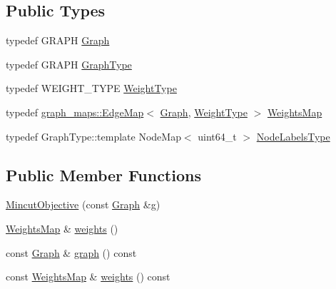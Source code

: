 \subsection*{Public Types}
\begin{DoxyCompactItemize}
\item 
typedef G\+R\+A\+P\+H \hyperlink{classnifty_1_1graph_1_1optimization_1_1mincut_1_1MincutObjective_a14651256f6659a97c452e9469b1df0c7}{Graph}
\item 
typedef G\+R\+A\+P\+H \hyperlink{classnifty_1_1graph_1_1optimization_1_1mincut_1_1MincutObjective_a67e2a1dba7b35b0ead06ce8b74152215}{Graph\+Type}
\item 
typedef W\+E\+I\+G\+H\+T\+\_\+\+T\+Y\+P\+E \hyperlink{classnifty_1_1graph_1_1optimization_1_1mincut_1_1MincutObjective_acbc5ba581d4e1677cee62a26001786a8}{Weight\+Type}
\item 
typedef \hyperlink{structnifty_1_1graph_1_1graph__maps_1_1EdgeMap}{graph\+\_\+maps\+::\+Edge\+Map}$<$ \hyperlink{classnifty_1_1graph_1_1optimization_1_1mincut_1_1MincutObjective_a14651256f6659a97c452e9469b1df0c7}{Graph}, \hyperlink{classnifty_1_1graph_1_1optimization_1_1mincut_1_1MincutObjective_acbc5ba581d4e1677cee62a26001786a8}{Weight\+Type} $>$ \hyperlink{classnifty_1_1graph_1_1optimization_1_1mincut_1_1MincutObjective_ad4674bd22bb638b7d83a3cf31059e4ed}{Weights\+Map}
\item 
typedef Graph\+Type\+::template Node\+Map$<$ uint64\+\_\+t $>$ \hyperlink{classnifty_1_1graph_1_1optimization_1_1mincut_1_1MincutObjective_aae8f1cd3353a96dfe22a0ba35f3f4ac3}{Node\+Labels\+Type}
\end{DoxyCompactItemize}
\subsection*{Public Member Functions}
\begin{DoxyCompactItemize}
\item 
\hyperlink{classnifty_1_1graph_1_1optimization_1_1mincut_1_1MincutObjective_ad3e8f453068825c86f09706e159e44fb}{Mincut\+Objective} (const \hyperlink{classnifty_1_1graph_1_1optimization_1_1mincut_1_1MincutObjective_a14651256f6659a97c452e9469b1df0c7}{Graph} \&g)
\item 
\hyperlink{classnifty_1_1graph_1_1optimization_1_1mincut_1_1MincutObjective_ad4674bd22bb638b7d83a3cf31059e4ed}{Weights\+Map} \& \hyperlink{classnifty_1_1graph_1_1optimization_1_1mincut_1_1MincutObjective_a0962678c9517b7b3299c05f5b772d4c0}{weights} ()
\item 
const \hyperlink{classnifty_1_1graph_1_1optimization_1_1mincut_1_1MincutObjective_a14651256f6659a97c452e9469b1df0c7}{Graph} \& \hyperlink{classnifty_1_1graph_1_1optimization_1_1mincut_1_1MincutObjective_a4a16c0bf0365692e5b213ee29938a1b6}{graph} () const 
\item 
const \hyperlink{classnifty_1_1graph_1_1optimization_1_1mincut_1_1MincutObjective_ad4674bd22bb638b7d83a3cf31059e4ed}{Weights\+Map} \& \hyperlink{classnifty_1_1graph_1_1optimization_1_1mincut_1_1MincutObjective_af47bf444d6fdd670bf68022b88214f7a}{weights} () const 
\end{DoxyCompactItemize}


